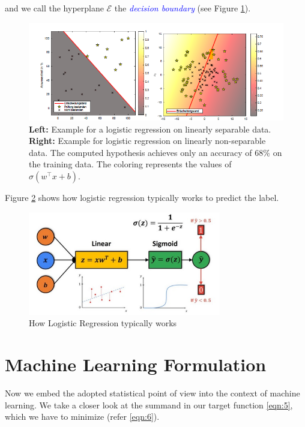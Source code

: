 and we call the hyperplane $\mathcal{E}$ the \textcolor{blue}{\emph{decision boundary}} (see Figure \ref{fig:2}).

\begin{figure}[h!]
    \centering
    \includegraphics[width=1\textwidth]{images/figure2.png}
    \caption{
        \textbf{Left:} Example for a logistic regression on linearly separable data.
        \textbf{Right:} Example for logistic regression on linearly non-separable data. The computed hypothesis achieves only an accuracy of 68\% on the training data. The coloring represents the values of $\sigma(w^\top x + b)$.
    }
    \label{fig:2}
\end{figure}

Figure \ref{fig:3} shows how logistic regression typically works to predict the label.

\begin{figure}[h!]
    \centering
    \includegraphics[width=0.75\textwidth]{images/figure3.jpg}
    \caption{How Logistic Regression typically works}
    \label{fig:3}
\end{figure}

\section{Machine Learning Formulation}
Now we embed the adopted statistical point of view into the context of machine learning. We take a closer look at the summand in our target function \ref{eqn:5}, which we have to minimize (refer \ref{eqn:6}).

